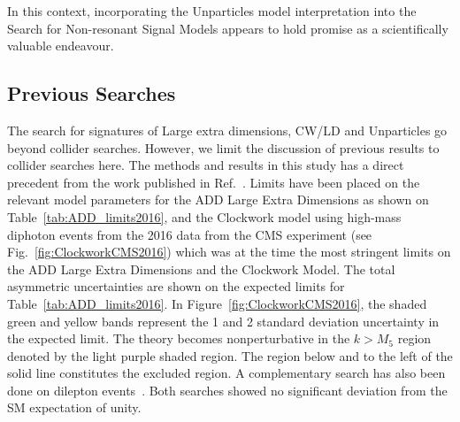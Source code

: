 In this context, incorporating the Unparticles model interpretation into the Search for Non-resonant Signal Models appears to hold promise as a scientifically valuable endeavour.

\subsection{Previous Searches}

The search for signatures of Large extra dimensions, CW/LD and Unparticles go beyond collider searches. However, we limit the discussion of previous results to collider searches here. The methods and results in this study has a direct precedent from the work published in Ref.~\cite{CMS:2018dqv}. Limits have been placed on the relevant model parameters for the ADD Large Extra Dimensions as shown on Table~\ref{tab:ADD_limits2016}, and the Clockwork model using high-mass diphoton events from the 2016 data from the CMS experiment (see Fig.~\ref{fig:ClockworkCMS2016}) which was at the time the most stringent limits on the ADD Large Extra Dimensions and the Clockwork Model. The total asymmetric uncertainties are shown on the expected limits for Table~\ref{tab:ADD_limits2016}. In Figure~\ref{fig:ClockworkCMS2016}, the shaded green and yellow bands represent the 1 and 2 standard deviation uncertainty in the expected limit. The theory becomes nonperturbative in the $k > M_5$ region denoted by the light purple shaded region. The region below and to the left of the solid line constitutes the excluded region. A complementary search has also been done on dilepton events~\cite{CMS:2021ctt}. Both searches showed no significant deviation from the SM expectation of unity.

